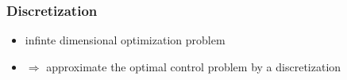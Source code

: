 
\begin{frame}
\frametitle{Discretization}
\begin{itemize}[<+->]
\item infinte dimensional optimization problem
\item $\Rightarrow$ approximate the optimal control problem by a discretization
\begin{figure}
\centering

\end{figure}
\end{itemize}




\end{frame}
